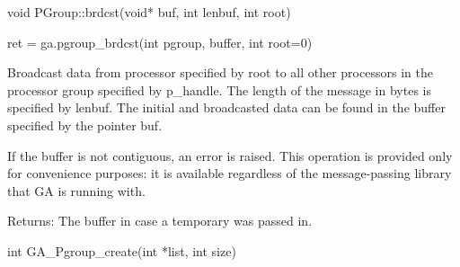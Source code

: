 \documentclass[12pt]{article}
\begin{document}
\begin{cxxapi}
\begin{cxxcode}
void PGroup::brdcst(void* buf, int lenbuf, int root)
\end{cxxcode}
\begin{funcargs}
\end{funcargs}
\end{cxxapi}

\begin{pyapi}
\begin{pycode}
ret = ga.pgroup_brdcst(int pgroup, buffer, int root=0)
\end{pycode}
\begin{funcargs}
\end{funcargs}
\end{pyapi}

\gcoll

\begin{desc}
Broadcast data from processor specified by root to all other processors in the
processor group specified by p_handle. The length of the message in bytes is
specified by lenbuf. The initial and broadcasted data can be found in the
buffer specified by the pointer buf.

If the buffer is not contiguous, an error is raised. This operation is provided
only for convenience purposes: it is available regardless of the
message-passing library that GA is running with.

Returns: The buffer in case a temporary was passed in.
\end{desc}



\begin{capi}
\begin{ccode}
int GA_Pgroup_create(int *list, int size)
\end{ccode}
\begin{funcargs}
\end{funcargs}
\end{capi}
\end{document}
